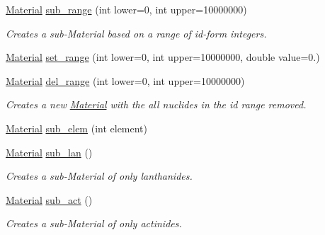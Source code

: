 \begin{DoxyCompactItemize}
\hyperlink{classpyne_1_1_material}{Material} \hyperlink{classpyne_1_1_material_ae7abcf8bf30eb3b2ec862df46e792865}{sub\+\_\+range} (int lower=0, int upper=10000000)
\begin{DoxyCompactList}\small\item\em Creates a sub-\/\+Material based on a range of id-\/form integers. \end{DoxyCompactList}\item 
\hyperlink{classpyne_1_1_material}{Material} \hyperlink{classpyne_1_1_material_af81eb0e8c7f65792bc699c4aec82bb7e}{set\+\_\+range} (int lower=0, int upper=10000000, double value=0.)
\item 
\mbox{\label{classpyne_1_1_material_a2e5387cd2fb1dea7bf6fdd567529ae6f}} 
\hyperlink{classpyne_1_1_material}{Material} \hyperlink{classpyne_1_1_material_a2e5387cd2fb1dea7bf6fdd567529ae6f}{del\+\_\+range} (int lower=0, int upper=10000000)
\begin{DoxyCompactList}\small\item\em Creates a new \hyperlink{classpyne_1_1_material}{Material} with the all nuclides in the id range removed. \end{DoxyCompactList}\item 
\hyperlink{classpyne_1_1_material}{Material} \hyperlink{classpyne_1_1_material_aa38cb12439e08391849d41f803f03495}{sub\+\_\+elem} (int element)
\item 
\mbox{\label{classpyne_1_1_material_ad5f4191cb47a820be447e0a4b70da96c}} 
\hyperlink{classpyne_1_1_material}{Material} \hyperlink{classpyne_1_1_material_ad5f4191cb47a820be447e0a4b70da96c}{sub\+\_\+lan} ()
\begin{DoxyCompactList}\small\item\em Creates a sub-\/\+Material of only lanthanides. \end{DoxyCompactList}\item 
\mbox{\label{classpyne_1_1_material_addb8d9eb230f9782ebf2f5381c35ccde}} 
\hyperlink{classpyne_1_1_material}{Material} \hyperlink{classpyne_1_1_material_addb8d9eb230f9782ebf2f5381c35ccde}{sub\+\_\+act} ()
\begin{DoxyCompactList}\small\item\em Creates a sub-\/\+Material of only actinides. \end{DoxyCompactList}\item 

\end{DoxyCompactItemize}
